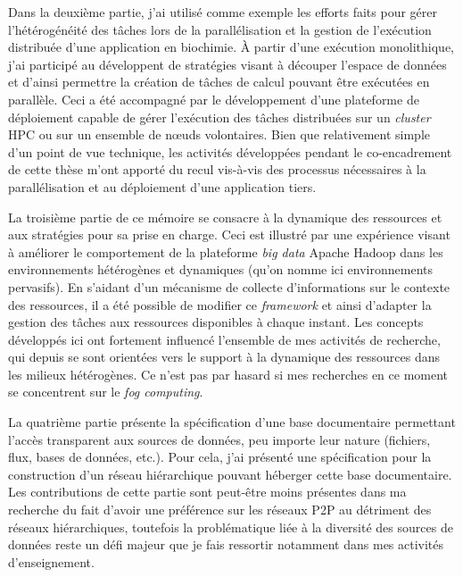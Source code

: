 Dans la deuxième partie, j'ai utilisé comme exemple les efforts faits pour gérer l'hétérogénéité des tâches lors de la parallélisation et la gestion de l'exécution distribuée d'une application en biochimie. À partir d'une exécution monolithique, j'ai participé au développent de stratégies visant à découper l'espace de données et d'ainsi permettre la création de tâches de calcul pouvant être exécutées en parallèle. Ceci a été accompagné par le développement d'une plateforme de déploiement capable de gérer l'exécution des tâches distribuées sur  un \textit{cluster} HPC ou sur un ensemble de n{\oe}uds volontaires. Bien que relativement simple d'un point de vue technique, les activités développées pendant le co-encadrement de cette thèse m'ont apporté du recul vis-à-vis des processus nécessaires à la parallélisation et au déploiement d'une application tiers.

La troisième partie de ce mémoire se consacre à la dynamique des ressources et aux stratégies pour sa prise en charge. Ceci est illustré par une expérience visant à améliorer le comportement de la plateforme \textit{big data} Apache Hadoop dans les environnements hétérogènes et dynamiques (qu'on nomme ici environnements pervasifs). En s'aidant d'un mécanisme de collecte d'informations sur le contexte des ressources, il a été possible de modifier ce \textit{framework} et ainsi d'adapter la gestion des tâches aux ressources disponibles à chaque instant. Les concepts développés ici ont fortement influencé l'ensemble de mes activités de recherche, qui depuis se sont orientées vers le support à la dynamique des ressources dans les milieux hétérogènes. Ce n'est pas par hasard si mes recherches en ce moment se concentrent sur le \textit{fog computing}.    

La quatrième partie présente la spécification d'une base documentaire permettant l'accès transparent aux sources de données, peu importe leur nature (fichiers, flux, bases de données, etc.). Pour cela, j'ai présenté une spécification pour la construction d'un réseau hiérarchique pouvant héberger cette base documentaire. Les contributions de cette partie sont peut-être moins présentes dans ma recherche du fait d'avoir une préférence sur les réseaux P2P au détriment des réseaux hiérarchiques, toutefois la problématique liée à la diversité des sources de données reste un défi majeur que je fais ressortir notamment dans mes activités d'enseignement.

